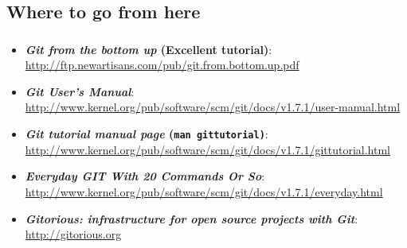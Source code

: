 \subsection{Where to go from here}
\begin{frame}
  \frametitle{\insertsubsection}

  \begin{itemize}
  \item \textbf{\textit{Git from the bottom up} (Excellent tutorial)}:\\
    \url{http://ftp.newartisans.com/pub/git.from.bottom.up.pdf}
    \vspacing
  \item \textbf{\textit{Git User's Manual}}:\\
    \url{http://www.kernel.org/pub/software/scm/git/docs/v1.7.1/user-manual.html}
    \vspacing
  \item \textbf{\textit{Git tutorial manual page} (\texttt{man gittutorial)}}:\\
    \url{http://www.kernel.org/pub/software/scm/git/docs/v1.7.1/gittutorial.html}
    \vspacing
  \item \textbf{\textit{Everyday GIT With 20 Commands Or So}}:\\
    \url{http://www.kernel.org/pub/software/scm/git/docs/v1.7.1/everyday.html}
    \vspacing
  \item \textbf{\textit{Gitorious: infrastructure for open source projects with Git}}:\\
    \url{http://gitorious.org}
    \vspacing
  \end{itemize}
\end{frame}

